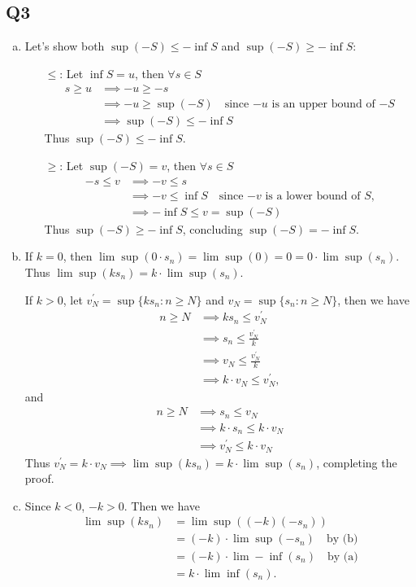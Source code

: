 \documentclass[12pt,lettersize]{article}
\begin{document}
	\subsection*{Q3}
	\begin{enumerate}[(a)]
		\item Let's show both $\sup(-S)\leq-\inf S$ and $\sup(-S)\geq-\inf S$:
		\begin{itemize}
			\item[$\leq$:] Let $\inf S=u$, then $\forall s\in S$
			\begin{align*}
				s\geq u &\implies -u\geq -s\\
						&\implies -u \geq \sup(-S)\quad\text{since $-u$ is an upper bound of $-S$}\\
						&\implies \sup(-S)\leq-\inf S
			\end{align*}
			Thus $\sup(-S)\leq-\inf S$.
			\item[$\geq$:] Let $\sup(-S)=v$, then $\forall s\in S$
			\begin{align*}
				-s\leq v &\implies -v\leq s\\
						 &\implies -v\leq\inf S\quad\text{since $-v$ is a lower bound of $S$,}\\
						 &\implies -\inf S\leq v=\sup(-S)
			\end{align*} 
			Thus $\sup(-S)\geq-\inf S$, concluding $\sup(-S)=-\inf S$.
		\end{itemize}
	
		\item If $k=0$, then $\lim\sup(0\cdot s_n)=\lim\sup(0)=0=0\cdot\lim\sup(s_n)$. Thus $\lim\sup(ks_n)=k\cdot\lim\sup(s_n)$.
		
		If $k>0$, let $v^\prime_N=\sup\{ks_n: n\geq N\}$ and $v_N=\sup\{s_n: n\geq N\}$, then we have
		\begin{align*}
			n\geq N &\implies ks_n\leq v^\prime_N\\
				&\implies s_n\leq\frac{v^\prime_N}{k}\\
				&\implies v_N\leq\frac{v^\prime_N}{k}\\
				&\implies k\cdot v_N\leq v^\prime_N,
		\end{align*}
		and 
		\begin{align*}
			n\geq N &\implies s_n\leq v_N\\
					&\implies k\cdot s_n\leq k\cdot v_N\\
					&\implies v_N^\prime\leq k\cdot v_N
		\end{align*}
		Thus $ v_N^\prime=k\cdot v_N\implies \lim\sup(ks_n)=k\cdot\lim\sup(s_n)$, completing the proof.
		
		\item Since $k<0$, $-k>0$. Then we have 
		\begin{align*}
			\lim\sup(ks_n) &= \lim\sup((-k)(-s_n))\\
						   &= (-k)\cdot\lim\sup(-s_n)\quad\text{by (b)}\\
						   &= (-k)\cdot\lim-\inf(s_n)\quad\text{by (a)}\\
						   &= k\cdot\lim\inf(s_n).
		\end{align*}
		
		
	\end{enumerate}
	\newpage
	
\end{document}
